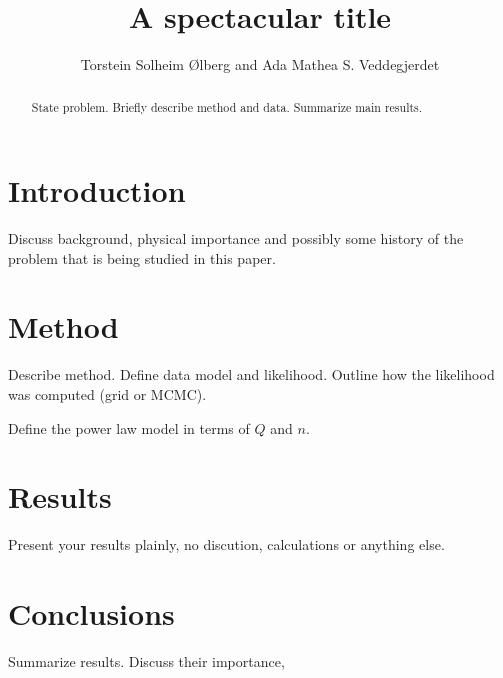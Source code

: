 \documentclass{emulateapj}
\begin{document}
\title{A spectacular title}

\author{Torstein Solheim Ølberg and Ada Mathea S. Veddegjerdet}



\begin{abstract}
  State problem. Briefly describe method and data. Summarize main results.
\end{abstract}

\section{Introduction}
\label{sec:introduction}

Discuss background, physical importance and possibly some history of
the problem that is being studied in this paper.


\section{Method}
\label{sec:method}


Describe method. Define data model and likelihood. Outline how the
likelihood was computed (grid or MCMC).

Define the power law model in terms of $Q$ and $n$. 

\section{Results}
\label{sec:results}

Present your results plainly, no discution, calculations or anything else.

\section{Conclusions}
\label{sec:conclusions}

Summarize results. Discuss their importance, 


\end{document}
